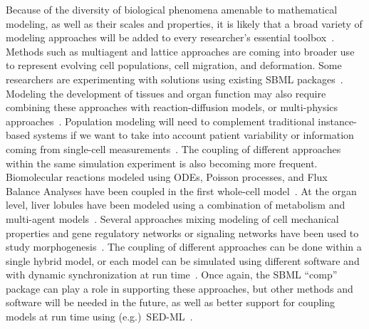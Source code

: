 \documentclass{sbml-paper}
\begin{document}
Because of the diversity of biological phenomena amenable to mathematical modeling, as well as their scales and properties, it is likely that a broad variety of modeling approaches will be added to every researcher's essential toolbox~\citep{Cvijovic2014bridging}.  Methods such as multiagent and lattice approaches are coming into broader use to represent evolving cell populations, cell migration, and deformation.  Some researchers are experimenting with solutions using existing SBML packages~\citep{watanabe2016efficient, varela2018epilog}.  Modeling the development of tissues and organ function may also require combining these approaches with reaction-diffusion models, or multi-physics approaches~\citep{Nickerson2016human}.  Population modeling will need to complement traditional instance-based systems if we want to take into account patient variability or information coming from single-cell measurements~\citep{Levin1997mathematical}.  The coupling of different approaches within the same simulation experiment is also becoming more frequent.  Biomolecular reactions modeled using ODEs, Poisson processes, and Flux Balance Analyses have been coupled in the first whole-cell model~\citep{Karr2015principles}.  At the organ level, liver lobules have been modeled using a combination of metabolism and multi-agent models~\citep{schliess2014integrated}.  Several approaches mixing modeling of cell mechanical properties and gene regulatory networks or signaling networks have been used to study morphogenesis~\citep[e.g.,][]{tanaka2015lbibcell}.  The coupling of different approaches can be done within a single hybrid model, or each model can be simulated using different software and with dynamic synchronization at run time~\citep{mattioni2013integration}.  Once again, the SBML ``comp'' package can play a role in supporting these approaches, but other methods and software will be needed in the future, as well as better support for coupling models at run time using (e.g.)\ SED-ML~\citep{waltemath2011reproducible}.
\end{document}
